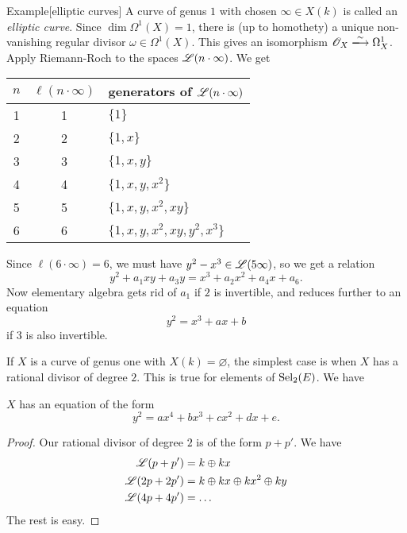 \begin{enonce}[remark]{Example}[elliptic curves]
A curve of genus $1$ with chosen $\infty\in X(k)$ is called an \emph{elliptic 
curve}. Since $\dim \Omega^1(X)=1$, there is (up to homothety) a unique 
non-vanishing regular divisor $\omega\in \Omega^1(X)$. This gives an 
isomorphism $\sO_X\iso \Omega_X^1$. Apply Riemann-Roch to the spaces 
$\mathscr{L}(n\cdot \infty)$. We get 
\begin{center}
\begin{tabular}{c|cl}
$n$ & $\ell(n\cdot \infty)$ & generators of $\mathscr{L}(n\cdot\infty)$ \\ \hline
1 & 1 & $\{1\}$ \\
2 & 2 & $\{1,x\}$ \\
3 & 3 & $\{1,x,y\}$ \\
4 & 4 & $\{1,x,y,x^2\}$ \\
5 & 5 & $\{1,x,y,x^2,x y\}$ \\
6 & 6 & $\{1,x,y,x^2,x y,y^2, x^3\}$
\end{tabular}
\end{center}
Since $\ell(6\cdot \infty)=6$, we must have $y^2-x^3\in \mathscr{L}(5\infty)$, 
so we get a relation 
\[
  y^2 + a_1 x y + a_3 y = x^3 + a_2 x^2 + a_4 x + a_6 .
\]
Now elementary algebra gets rid of $a_1$ if $2$ is invertible, and reduces 
further to an equation 
\[
  y^2 = x^3 + a x+b 
\]
if $3$ is also invertible. 
\end{enonce}

If $X$ is a curve of genus one with $X(k)=\varnothing$, the simplest case is 
when $X$ has a rational divisor of degree $2$. This is true for elements of 
$\operatorname{Sel}_2(E)$. We have 

\begin{theo}
$X$ has an equation of the form 
\[
  y^2 = a x^4 + b x^3 + c x^2 + d x+e .
\]
\end{theo}
\begin{proof}
Our rational divisor of degree $2$ is of the form $p+p'$. We have 
\begin{align*}
  \mathscr{L}(p+p') &= k\oplus k x \\
  \mathscr{L}(2 p+2 p') &= k\oplus k x\oplus k x^2\oplus k y \\
  \mathscr{L}(4 p+4 p') &= \ldots 
\end{align*}
The rest is easy. 
\end{proof}





